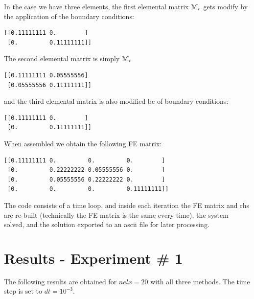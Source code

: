 In the case we have three elements, the first elemental matrix ${\mathbb{M}}_e$
gets modify by the application of the boundary conditions:
\begin{verbatim}
[[0.11111111 0.        ]
 [0.         0.11111111]]
\end{verbatim}
The second elemental matrix is simply ${\mathbb{M}}_e$
\begin{verbatim}
[[0.11111111 0.05555556]
 [0.05555556 0.11111111]]
\end{verbatim}
and the third elemental matrix is also modified bc of boundary conditions:
\begin{verbatim}
[[0.11111111 0.        ]
 [0.         0.11111111]]
\end{verbatim}
When assembled we obtain the following FE matrix:
\begin{verbatim}
[[0.11111111 0.         0.         0.        ]
 [0.         0.22222222 0.05555556 0.        ]
 [0.         0.05555556 0.22222222 0.        ]
 [0.         0.         0.         0.11111111]]
\end{verbatim}

The code consists of a time loop, and inside each iteration 
the FE matrix and rhs are re-built (technically the FE matrix 
is the same every time), the system solved, and the solution
exported to an ascii file for later processing.

\section*{Results - Experiment \# 1}

The following results are obtained for $nelx=20$ with all three methods.
The time step is set to $dt=10^{-3}$. 

